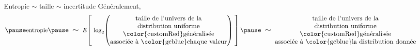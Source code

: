 \begin{frame}{\huge Entropie \;$\sim$\; taille \;$\sim$\; incertitude}
\small
\pause
G\'en\'eralement,
\scriptsize
\begin{equation*}
\pause
\textnormal{\small entropie}
\pause
\;\;\textnormal{\large$\sim$}\;\;
	\textnormal{\small$E$}\!\left[\;
		\textnormal{\small$\log_{2}$}
		\!\left(\!\!\!\begin{array}{c}
			\textnormal{taille de l'univers de la}
			\\
			\textnormal{distribution uniforme}
			\\
			\textnormal{\color{customRed}g\'en\'eralis\'ee}
			\\
			\textnormal{associ\'ee \`a {\color{gcblue}chaque valeur}}
		\end{array}\!\!\!\right)
	\;\right]
\pause
\;\;\textnormal{\large$\sim$}\;\;
	\!\!\!\begin{array}{c}
		\textnormal{taille de l'univers de la}
		\\
		\textnormal{distribution uniforme}
		\\
		\textnormal{\color{customRed}g\'en\'eralis\'ee}
		\\
		\textnormal{associ\'ee \`a {\color{gcblue}la distribution donn\'ee}}
	\end{array}
\end{equation*}

\normalsize
\end{frame}


